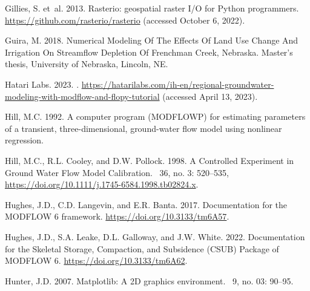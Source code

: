 \documentclass[12pt, oneside]{article}  	%
\begin{document}
\begin{thebibliography}{}
Gillies, S. et~al. 2013.
\newblock Rasterio: geospatial raster I/O for {Python} programmers.
\newblock \url{https://github.com/rasterio/rasterio} (accessed October 6,
  2022).

Guira, M. 2018.
\newblock Numerical Modeling Of The Effects Of Land Use Change And Irrigation
  On Streamflow Depletion Of Frenchman Creek, Nebraska.
\newblock Master's thesis, University of Nebraska, Lincoln, NE.

{{Hatari Labs}}. 2023.
.
\newblock
  \url{https://hatarilabs.com/ih-en/regional-groundwater-modeling-with-modflow-and-flopy-tutorial}
  (accessed April 13, 2023).

Hill, M.C. 1992.
\newblock A computer program (MODFLOWP) for estimating parameters of a
  transient, three-dimensional, ground-water flow model using nonlinear
  regression.

Hill, M.C., R.L. Cooley, and D.W. Pollock. 1998.
\newblock A Controlled Experiment in Ground Water Flow Model Calibration.
~36, no. 3: 520--535,
  \url{https://doi.org/10.1111/j.1745-6584.1998.tb02824.x}.

Hughes, J.D., C.D. Langevin, and E.R. Banta. 2017.
\newblock Documentation for the MODFLOW 6 framework.
 \url{https://doi.org/10.3133/tm6A57}.

Hughes, J.D., S.A. Leake, D.L. Galloway, and J.W. White. 2022.
\newblock Documentation for the Skeletal Storage, Compaction, and Subsidence
  (CSUB) Package of MODFLOW 6.
 \url{https://doi.org/10.3133/tm6A62}.

Hunter, J.D. 2007.
\newblock Matplotlib: A 2D graphics environment.
~9, no. 03: 90--95.


\end{thebibliography}
\end{document}
